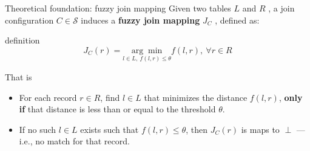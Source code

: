 \documentclass[8pt]{beamer} %
\begin{document}
\begin{frame}{Theoretical foundation: fuzzy join mapping}
	Given two tables $L$  and $R$ , a join configuration $C \in \mathcal{S}$ induces a \textbf{fuzzy join mapping} $J_C$ , defined as:
	
	\vspace{1em}
	
	\begin{beamercolorbox}[rounded=true, shadow=true, leftskip=1em, rightskip=1em]{definition}
	$$
		J_C(r) = \underset{l \in L,\ f(l, r) \leq \theta}{\arg\min} f(l, r),\ \forall r \in R
	$$
	\end{beamercolorbox}
	
	\vspace{1em}
	
	That is
	\begin{itemize}
		\item For each record $r \in R$, find $l \in L$ that minimizes the distance $f(l, r)$, \textbf{only if} that distance is less than or equal to the threshold $\theta$.
		\item If no such $l \in L$ exists such that $f(l, r) \leq \theta$, then $J_C(r)$ is maps to $\perp$ — i.e., no match for that record.
	\end{itemize}

\end{frame}
\end{document}
